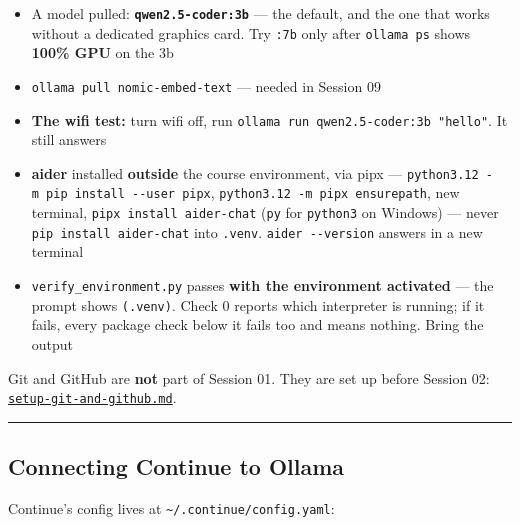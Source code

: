 \documentclass[
  letterpaper,
  10pt,
  twoside,
  openright,
  numbers=noenddot,
  chapterprefix=true]{scrbook}
\begin{document}
\begin{itemize}
  \texttt{ollama\ -\/-version} works
\item[$\square$]
  A model pulled: \textbf{\texttt{qwen2.5-coder:3b}} --- the default,
  and the one that works without a dedicated graphics card. Try
  \texttt{:7b} only after \texttt{ollama\ ps} shows \textbf{100\% GPU}
  on the 3b
\item[$\square$]
  \texttt{ollama\ pull\ nomic-embed-text} --- needed in Session 09
\item[$\square$]
  \textbf{The wifi test:} turn wifi off, run
  \texttt{ollama\ run\ qwen2.5-coder:3b\ "hello"}. It still answers
\item[$\square$]
  \textbf{aider} installed \textbf{outside} the course environment, via
  pipx --- \texttt{python3.12\ -m\ pip\ install\ -\/-user\ pipx},
  \texttt{python3.12\ -m\ pipx\ ensurepath}, new terminal,
  \texttt{pipx\ install\ aider-chat} (\texttt{py} for \texttt{python3}
  on Windows) --- never \texttt{pip\ install\ aider-chat} into
  \texttt{.venv}. \texttt{aider\ -\/-version} answers in a new terminal
\item[$\square$]
  \texttt{verify\_environment.py} passes \textbf{with the environment
  activated} --- the prompt shows \texttt{(.venv)}. Check 0 reports
  which interpreter is running; if it fails, every package check below
  it fails too and means nothing. Bring the output
\end{itemize}

Git and GitHub are \textbf{not} part of Session 01. They are set up
before Session 02:
\hyperref[exploratory-data-analysis-and-the-first-model]{\texttt{setup-git-and-github.md}}.

\begin{center}\rule{0.5\linewidth}{0.5pt}\end{center}

\subsection{Connecting Continue to
Ollama}\label{connecting-continue-to-ollama}

Continue's config lives at
\texttt{\textasciitilde{}/.continue/config.yaml}:
\end{document}

